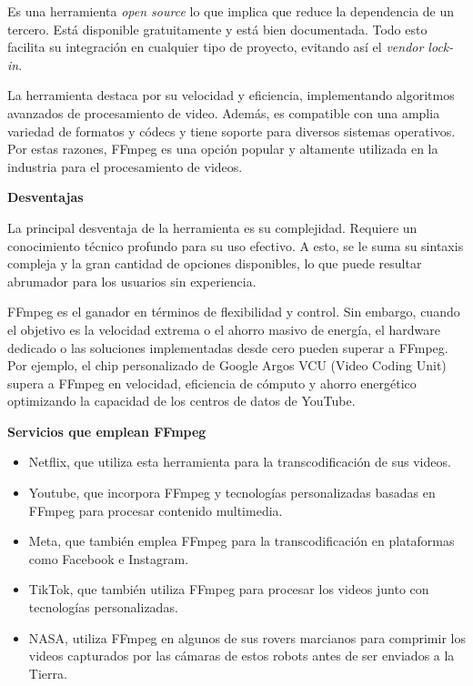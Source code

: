 Es una herramienta \textit{open source} lo que implica que reduce la dependencia de un tercero. Está disponible gratuitamente y está bien documentada. Todo esto facilita su integración en cualquier tipo de proyecto, evitando así el \textit{vendor lock-in}. 

La herramienta destaca por su velocidad y eficiencia, implementando algoritmos avanzados de procesamiento de video. Además, es compatible con una amplia variedad de formatos y códecs y tiene soporte para diversos sistemas operativos. Por estas razones, FFmpeg es una opción popular y altamente utilizada en la industria para el procesamiento de videos.

\textbf{Desventajas}

La principal desventaja de la herramienta es su complejidad. Requiere un conocimiento técnico profundo para su uso efectivo. A esto, se le suma su sintaxis compleja y la gran cantidad de opciones disponibles, lo que puede resultar abrumador para los usuarios sin experiencia.

FFmpeg es el ganador en términos de flexibilidad y control. Sin embargo, cuando el objetivo es la velocidad extrema o el ahorro masivo de energía, el hardware dedicado o las soluciones implementadas desde cero pueden superar a FFmpeg. Por ejemplo, el chip personalizado de Google Argos VCU (Video Coding Unit) supera a FFmpeg en velocidad, eficiencia de cómputo y ahorro energético optimizando la capacidad de los centros de datos de YouTube. \cite{google-vcu}  


\textbf{Servicios que emplean FFmpeg}

\begin{itemize}
    \item Netflix, que utiliza esta herramienta para la transcodificación de sus videos.
    \item Youtube, que incorpora FFmpeg y tecnologías personalizadas basadas en FFmpeg para procesar contenido multimedia.
    \item Meta, que también emplea FFmpeg para la transcodificación en plataformas como Facebook e Instagram.
    \item TikTok, que también utiliza FFmpeg para procesar los videos junto con tecnologías personalizadas.
    \item NASA, utiliza FFmpeg en algunos de sus rovers marcianos para comprimir los videos capturados por las cámaras de estos robots antes de ser enviados a la Tierra.
\end{itemize}


